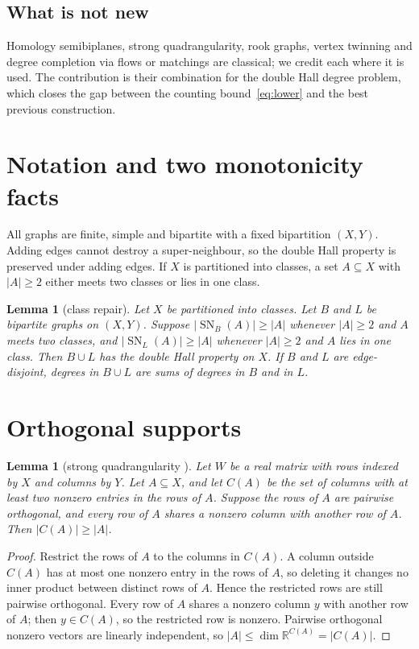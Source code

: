 \documentclass[11pt]{amsart}
\newtheorem{lemma}[theorem]{Lemma}
\theoremstyle{definition}
\theoremstyle{remark}
\newcommand{\sn}{\operatorname{SN}}
\begin{document}
\subsection*{What is not new}
Homology semibiplanes, strong quadrangularity, rook graphs, vertex twinning and degree
completion via flows or matchings are classical; we credit each where it is used. The
contribution is their combination for the double Hall degree problem, which closes the
gap between the counting bound~\eqref{eq:lower} and the best previous construction.

\section{Notation and two monotonicity facts}

All graphs are finite, simple and bipartite with a fixed bipartition $(X,Y)$. Adding edges
cannot destroy a super-neighbour, so the double Hall property is preserved under adding
edges. If $X$ is partitioned into classes, a set $A\subseteq X$ with $|A|\ge2$ either meets
two classes or lies in one class.

\begin{lemma}[class repair]\label{lem:repair}
Let $X$ be partitioned into classes. Let $B$ and $L$ be bipartite graphs on $(X,Y)$. Suppose
$|\sn_B(A)|\ge|A|$ whenever $|A|\ge2$ and $A$ meets two classes, and
$|\sn_L(A)|\ge|A|$ whenever $|A|\ge2$ and $A$ lies in one class. Then $B\cup L$ has the
double Hall property on $X$. If $B$ and $L$ are edge-disjoint, degrees in $B\cup L$ are
sums of degrees in $B$ and in $L$.
\end{lemma}

\section{Orthogonal supports}

\begin{lemma}[strong quadrangularity {\cite{Severini,SeveriniSzollosi}}]\label{lem:orth}
Let $W$ be a real matrix with rows indexed by $X$ and columns by $Y$. Let $A\subseteq X$,
and let $C(A)$ be the set of columns with at least two nonzero entries in the rows of $A$.
Suppose the rows of $A$ are pairwise orthogonal, and every row of $A$ shares a nonzero
column with another row of $A$. Then $|C(A)|\ge|A|$.
\end{lemma}

\begin{proof}
Restrict the rows of $A$ to the columns in $C(A)$. A column outside $C(A)$ has at most one
nonzero entry in the rows of $A$, so deleting it changes no inner product between distinct
rows of $A$. Hence the restricted rows are still pairwise orthogonal. Every row of $A$ shares a
nonzero column $y$ with another row of $A$; then $y\in C(A)$, so the restricted row is
nonzero. Pairwise orthogonal nonzero vectors are linearly independent, so
$|A|\le\dim\mathbb{R}^{C(A)}=|C(A)|$.
\end{proof}
\end{document}

